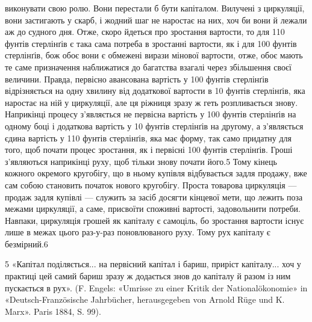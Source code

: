 виконувати свою ролю. Вони перестали б бути капіталом. Вилучені
з циркуляції, вони застигають у скарб, і жодний шаг не наростає
на них, хоч би вони й лежали аж до судного дня. Отже,
скоро йдеться про зростання вартости, то для 110 фунтів стерлінґів
є така сама потреба в зростанні вартости, як і для 100 фунтів
стерлінґів, бож обоє вони є обмежені вирази мінової вартости,
отже, обоє мають те саме призначення наближатися до багатства
взагалі через збільшення своєї величини. Правда, первісно авансована
вартість у 100 фунтів стерлінґів відрізняється на одну хвилину
від додаткової вартости в 10 фунтів стерлінґів, яка наростає
на ній у циркуляції, але ця ріжниця зразу ж геть розпливається
знову. Наприкінці процесу з’являється не первісна вартість
у 100 фунтів стерлінґів на одному боці і додаткова вартість у
10 фунтів стерлінґів на другому, а з’являється єдина вартість у
110 фунтів стерлінґів, яка має форму, так само придатну для того,
щоб почати процес зростання, як і первісні 100 фунтів стерлінґів.
Гроші з’являються наприкінці руху, щоб тільки знову почати
його.5 Тому кінець кожного окремого кругобігу, що в ньому
купівля відбувається задля продажу, вже сам собою становить
початок нового кругобігу. Проста товарова циркуляція — продаж
задля купівлі — служить за засіб досягти кінцевої мети,
що лежить поза межами циркуляції, а саме, присвоїти споживні
вартості, задовольнити потреби. Навпаки, циркуляція грошей
як капіталу є самоціль, бо зростання вартости існує лише в межах
цього раз-у-раз поновлюваного руху. Тому рух капіталу є
безмірний.6

5 «Капітал поділяється... на первісний капітал і бариш, приріст
капіталу... хоч у практиці цей самий бариш зразу ж додається знов до
капіталу й разом із ним пускається в рух». (F. Engels: «Umrisse zu
einer Kritik der Nationalökonomie» in «Deutsch-Französische Jahrbücher,
herausgegeben von Arnold Rüge und K. Marx». Paris 1884, S. 99).


